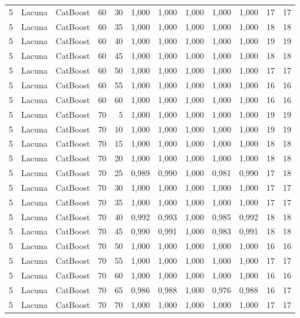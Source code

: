\begin{longtable}{@{}rllrrrrrrrrr@{}}
5 & Lacuna & CatBoost & 60 & 30 & 1,000 & 1,000 & 1,000 & 1,000 & 1,000 & 17 & 17 \\
5 & Lacuna & CatBoost & 60 & 35 & 1,000 & 1,000 & 1,000 & 1,000 & 1,000 & 18 & 18 \\
5 & Lacuna & CatBoost & 60 & 40 & 1,000 & 1,000 & 1,000 & 1,000 & 1,000 & 19 & 19 \\
5 & Lacuna & CatBoost & 60 & 45 & 1,000 & 1,000 & 1,000 & 1,000 & 1,000 & 18 & 18 \\
5 & Lacuna & CatBoost & 60 & 50 & 1,000 & 1,000 & 1,000 & 1,000 & 1,000 & 17 & 17 \\
5 & Lacuna & CatBoost & 60 & 55 & 1,000 & 1,000 & 1,000 & 1,000 & 1,000 & 16 & 16 \\
5 & Lacuna & CatBoost & 60 & 60 & 1,000 & 1,000 & 1,000 & 1,000 & 1,000 & 16 & 16 \\
5 & Lacuna & CatBoost & 70 & 5 & 1,000 & 1,000 & 1,000 & 1,000 & 1,000 & 19 & 19 \\
5 & Lacuna & CatBoost & 70 & 10 & 1,000 & 1,000 & 1,000 & 1,000 & 1,000 & 19 & 19 \\
5 & Lacuna & CatBoost & 70 & 15 & 1,000 & 1,000 & 1,000 & 1,000 & 1,000 & 18 & 18 \\
5 & Lacuna & CatBoost & 70 & 20 & 1,000 & 1,000 & 1,000 & 1,000 & 1,000 & 18 & 18 \\
5 & Lacuna & CatBoost & 70 & 25 & 0,989 & 0,990 & 1,000 & 0,981 & 0,990 & 17 & 18 \\
5 & Lacuna & CatBoost & 70 & 30 & 1,000 & 1,000 & 1,000 & 1,000 & 1,000 & 17 & 17 \\
5 & Lacuna & CatBoost & 70 & 35 & 1,000 & 1,000 & 1,000 & 1,000 & 1,000 & 17 & 17 \\
5 & Lacuna & CatBoost & 70 & 40 & 0,992 & 0,993 & 1,000 & 0,985 & 0,992 & 18 & 18 \\
5 & Lacuna & CatBoost & 70 & 45 & 0,990 & 0,991 & 1,000 & 0,983 & 0,991 & 18 & 18 \\
5 & Lacuna & CatBoost & 70 & 50 & 1,000 & 1,000 & 1,000 & 1,000 & 1,000 & 16 & 16 \\
5 & Lacuna & CatBoost & 70 & 55 & 1,000 & 1,000 & 1,000 & 1,000 & 1,000 & 17 & 17 \\
5 & Lacuna & CatBoost & 70 & 60 & 1,000 & 1,000 & 1,000 & 1,000 & 1,000 & 16 & 16 \\
5 & Lacuna & CatBoost & 70 & 65 & 0,986 & 0,988 & 1,000 & 0,976 & 0,988 & 16 & 17 \\
5 & Lacuna & CatBoost & 70 & 70 & 1,000 & 1,000 & 1,000 & 1,000 & 1,000 & 17 & 17 \\

\end{longtable}
